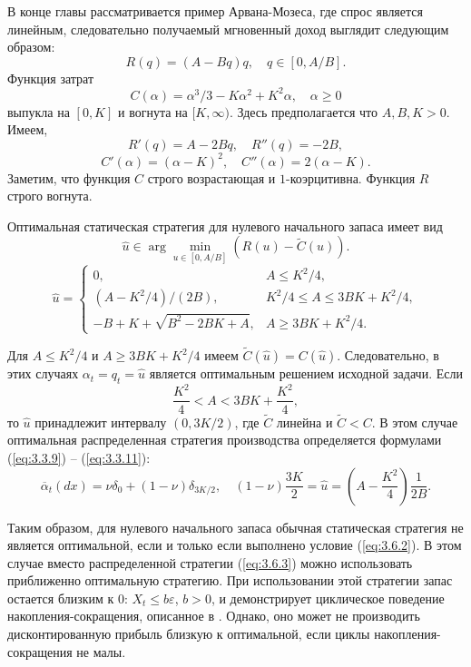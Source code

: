 \documentclass[twoside,12pt]{article}
\begin{document}
В конце главы рассматривается пример Арвана-Мозеса, где спрос является линейным, следовательно получаемый мгновенный доход выглядит следующим образом:
$$ R(q)=(A-Bq)q,\quad q\in [0,A/B].$$
Функция затрат
$$ C(\alpha)=\alpha^3/3-K\alpha^2+K^2\alpha,\quad \alpha\ge 0$$
выпукла на $[0,K]$ и вогнута на $[K,\infty)$. Здесь предполагается что $A, B, K>0$.
Имеем,
$$ R'(q)=A-2Bq,\quad R''(q)=-2B,$$
$$ C'(\alpha)=(\alpha-K)^2,\quad C''(\alpha)=2(\alpha-K).$$
Заметим, что функция $C$ строго возрастающая и $1$-коэрцитивна. Функция $R$ строго вогнута.

Оптимальная статическая стратегия для нулевого начального запаса имеет вид
$$ \widehat u\in\arg\min_{u\in [0,A/B]}(R(u)-\widetilde C(u)).$$
\begin{equation} \label{eq:3.6.1}
\widehat u=\begin{cases}
0,& A\le K^2/4,\\
(A-K^2/4)/(2B),& K^2/4\le A\le 3BK+K^2/4,\\
-B+K+\sqrt{B^2-2BK+A},& A\ge 3BK+K^2/4.
\end{cases}
\end{equation}

Для $A\le K^2/4$ и $A\ge 3BK+K^2/4$ имеем $\widetilde C(\widehat u)=C(\widehat u)$. Следовательно, в этих случаях $\alpha_t=q_t=\widehat u$ является оптимальным решением исходной задачи. Если
\begin{equation} \label{eq:3.6.2}
\frac{K^2}{4}< A< 3BK+\frac{K^2}{4},
\end{equation}
то $\widehat u$ принадлежит интервалу $(0,3K/2)$, где $\widetilde C$ линейна и $\widetilde C<C$. В этом случае оптимальная распределенная стратегия производства определяется формулами (\ref{eq:3.3.9}) -- (\ref{eq:3.3.11}):
\begin{equation} \label{eq:3.6.3}
\overline\alpha_t(dx)=\nu\delta_0+(1-\nu)\delta_{3K/2},\quad (1-\nu)\frac{3K}{2}=\widehat u=\left(A-\frac{K^2}{4}\right)\frac{1}{2B}.
\end{equation}

Таким образом, для нулевого начального запаса обычная статическая стратегия не является оптимальной, если и только если выполнено условие (\ref{eq:3.6.2}). В этом случае вместо распределенной стратегии (\ref{eq:3.6.3}) можно использовать приближенно оптимальную стратегию. При использовании этой стратегии запас остается близким к $0$: $X_t\le b\varepsilon$, $b>0$, и демонстрирует циклическое поведение накопления-сокращения, описанное в . Однако, оно может не производить дисконтированную прибыль близкую к оптимальной, если циклы накопления-сокращения не малы.
\end{document}
